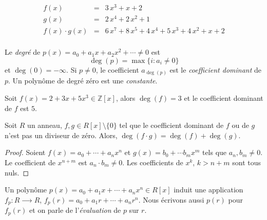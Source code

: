 \begin{example}
  \label{exe:33}
  \begin{eqnarray*}
    f(x) & = &  3 \, x^{3} + x + 2 \\
    g(x) & = & 2 \, x^{4} + 2 \, x^{2} + 1 \\
    f(x) ⋅g(x) & = & 6 \, x^{7} + 8 \, x^{5} + 4 \, x^{4} + 5 \, x^{3} + 4 \,  x^{2} + x + 2 \\ 
  \end{eqnarray*}
\end{example}




\begin{definition}
  \label{def:52}
Le \emph{degré} de $p(x) = a_0 + a_1x + a_2x^2 + \cdots \neq 0$ est 
\begin{displaymath}
  \deg(p) = \max\{i \colon  a_i \neq 0\}
\end{displaymath}
et $\deg(0) = -\infty$. 
Si $p \neq 0$, le coefficient $a_{\deg(p)}$ est le \emph{coefficient dominant} de $p$. 
Un polynôme de degré zéro est une \emph{constante}.
\end{definition}

\begin{example}
  \label{exe:35}
  Soit $f(x) = 2 + 3x + 5x^3 ∈ ℤ[x]$, alors $\deg(f) =3$  et le coefficient dominant de $f$ est $5$. 
\end{example}

\begin{theorem}
  \label{thr:34} Soit $R$ un anneau,   $f,g \in R[x] \setminus \{0\}$ tel que le coefficient dominant de $f$ ou de $g$ n'est pas un diviseur de zéro.  Alors, $\deg(f \cdot g) = \deg(f) + \deg(g)$. 
\end{theorem}
\begin{proof}
  
  Soient $f(x) = a_0 + \cdots + a_n x^n$ et $g(x) = b_0+ \cdots b_m x^m$ tels que $a_n, b_m  \neq 0$. Le coefficient de $x^{n+m}$  est $a_n \cdot  b_m \neq 0$. Les coefficients de $x^k$, $k> n+m$ sont tous nuls.  
\end{proof}

Un polynôme $p(x) = a_0 + a_1 x + \cdots + a_n x^n ∈ R[x]$ induit une application $f_p:  R ⟶ R$, $f_p(r) = a_0+ a_1 r+ \cdots + a_n r^n$. Nous écrivons aussi $p(r)$ pour $f_p(r)$ et on parle de l'\emph{évaluation} de $p$ sur $r$. 

